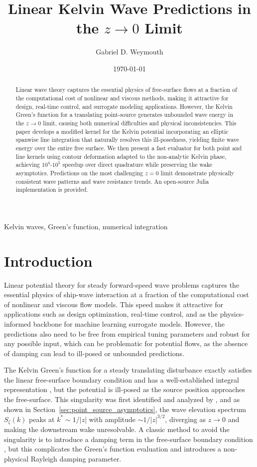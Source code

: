 \documentclass[]{JFM-FLM_Au}
\title{Linear Kelvin Wave Predictions in the $z\to 0$ Limit}
\author{Gabriel D. Weymouth}
\affiliation{Ship Hydromechanics, Delft University of Technology, Delft, Netherlands}
\date{\today}
\begin{document}
\maketitle

\begin{abstract}
Linear wave theory captures the essential physics of free-surface flows at a fraction of the computational cost of nonlinear and viscous methods, making it attractive for design, real-time control, and surrogate modeling applications. However, the Kelvin Green's function for a translating point-source generates unbounded wave energy in the $z\to 0$ limit, causing both numerical difficulties and physical inconsistencies. This paper develops a modified kernel for the Kelvin potential incorporating an elliptic spanwise line integration that naturally resolves this ill-posedness, yielding finite wave energy over the entire free surface. We then present a fast evaluator for both point and line kernels using contour deformation adapted to the non-analytic Kelvin phase, achieving $10^4$-$10^5$ speedup over direct quadrature while preserving the wake asymptotics. Predictions on the most challenging $z=0$ limit demonstrate physically consistent wave patterns and wave resistance trends. An open-source Julia implementation is provided.
\end{abstract}

\begin{keywords}
Kelvin waves, Green's function, numerical integration
\end{keywords}

\section{Introduction}

Linear potential theory for steady forward-speed wave problems captures the essential physics of ship-wave interaction at a fraction of the computational cost of nonlinear and viscous flow models. This speed makes it attractive for applications such as design optimization, real-time control, and as the physics-informed backbone for machine learning surrogate models. However, the predictions also need to be free from empirical tuning parameters and robust for any possible input, which can be problematic for potential flows, as the absence of damping can lead to ill-posed or unbounded predictions.

The Kelvin Green's function for a steady translating disturbance exactly satisfies the linear free-surface boundary condition and has a well-established integral representation \citep{peters_new_1949}, but the potential is ill-posed as the source position approaches the free-surface. This singularity was first identified and analyzed by \cite{ursell_kelvins_1960}, and as shown in Section~\ref{sec:point_source_asymptotics}, the wave elevation spectrum $S_\zeta(k)$ peaks at $k^* \sim 1/|z|$ with amplitude $\sim 1/|z|^{3/2}$, diverging as $z\to 0$ and making the downstream wake unresolvable. A classic method to avoid the singularity is to introduce a damping term in the free-surface boundary condition \citep{havelock_theory_1932, furth_dissipative_2021}, but this complicates the Green's function evaluation and introduces a non-physical Rayleigh damping parameter.
\end{document}
